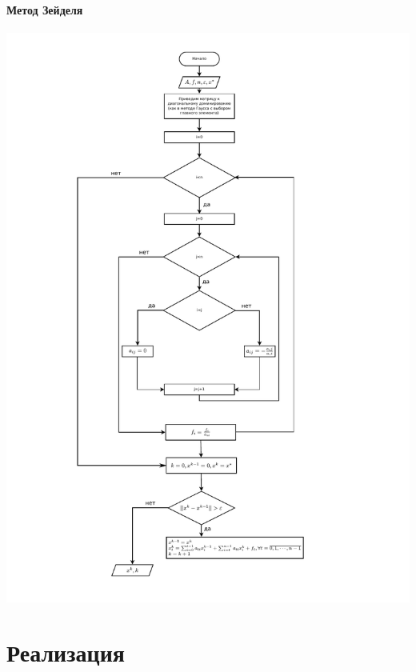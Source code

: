 \documentclass[a4paper,11pt]{extarticle}
\begin{document}
 \subsection*{Метод Зейделя}
 \includegraphics[scale=0.9]{flowchartZeidel.pdf} 
  


\newpage
\part*{Реализация}

 

 

\newpage
\end{document}
